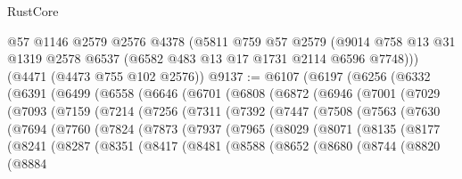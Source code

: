 \begin{lexlean}{RustCore}
\begin{coremodule}
    @57
    @1146
    @2579
    @2576
    @4378
    (@5811
      @759
      @57
      @2579
      (@9014 @758 @13 @31 @1319 @2578 @6537 (@6582 @483 @13 @17 @1731 @2114 @6596 @7748)))
    (@4471 (@4473 @755 @102 @2576))
@9137 := @6107
    (@6197
      (@6256
        (@6332
          (@6391
            (@6499
              (@6558
                (@6646
                  (@6701
                    (@6808
                      (@6872
                        (@6946
                          (@7001
                            (@7029
                              (@7093
                                (@7159
                                  (@7214
                                    (@7256
                                      (@7311
                                        (@7392
                                          (@7447
                                            (@7508
                                              (@7563
                                                (@7630
                                                  (@7694
                                                    (@7760
                                                      (@7824
                                                        (@7873
                                                          (@7937
                                                            (@7965
                                                              (@8029
                                                                (@8071
                                                                  (@8135
                                                                    (@8177
                                                                      (@8241
                                                                        (@8287
                                                                          (@8351
                                                                            (@8417
                                                                              (@8481
                                                                                (@8588
                                                                                  (@8652
                                                                                    (@8680
                                                                                      (@8744
                                                                                        (@8820
                                                                                          (@8884

\end{coremodule}
\end{lexlean}
